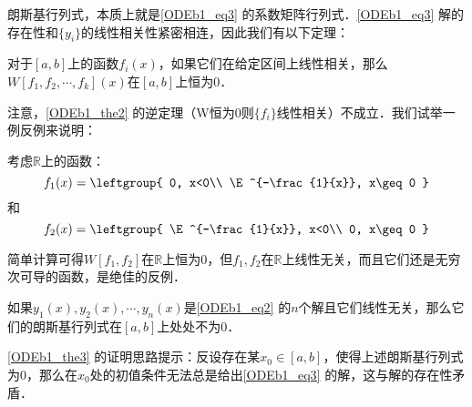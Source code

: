 朗斯基行列式，本质上就是\autoref{ODEb1_eq3} 的系数矩阵行列式．\autoref{ODEb1_eq3} 解的存在性和$\{y_i\}$的线性相关性紧密相连，因此我们有以下定理：




\begin{theorem}{}\label{ODEb1_the2}
对于$[a, b]$上的函数$f_i(x)$，如果它们在给定区间上线性相关，那么$W[f_1, f_2, \cdots, f_k](x)$在$[a, b]$上恒为$0$．
\end{theorem}

注意，\autoref{ODEb1_the2} 的逆定理（W恒为$0$则$\{f_i\}$线性相关）不成立．我们试举一例反例来说明：

\begin{example}{}
考虑$\mathbb{R}$上的函数：
\begin{equation}
f_1(x)=\leftgroup{
    0, x<0\\
    \E^{-\frac{1}{x}}, x\geq 0
}
\end{equation}
和
\begin{equation}
f_2(x)=\leftgroup{
    \E^{-\frac{1}{x}}, x<0\\
    0, x\geq 0
}
\end{equation}

简单计算可得$W[f_1, f_2]$在$\mathbb{R}$上恒为$0$，但$f_1, f_2$在$\mathbb{R}$上线性无关，而且它们还是无穷次可导的函数，是绝佳的反例．




\end{example}

\begin{theorem}{}\label{ODEb1_the3}
如果$y_1(x), y_2(x), \cdots, y_n(x)$是\autoref{ODEb1_eq2} 的$n$个解且它们线性无关，那么它们的朗斯基行列式在$[a, b]$上处处不为$0$．
\end{theorem}

\autoref{ODEb1_the3} 的证明思路提示：反设存在某$x_0\in[a, b]$，使得上述朗斯基行列式为$0$，那么在$x_0$处的初值条件无法总是给出\autoref{ODEb1_eq3} 的解，这与解的存在性矛盾．








